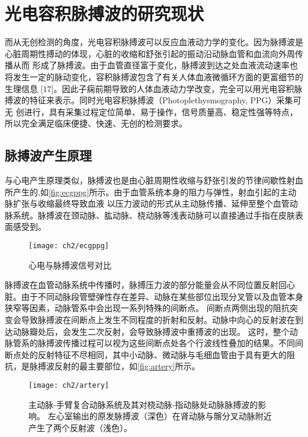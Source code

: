 \section{光电容积脉搏波的研究现状}
而从无创检测的角度，光电容积脉搏波可以反应血液动力学的变化。因为脉搏波是心脏周期性搏动的体现，心脏的收缩和舒张引起的振动沿动脉血管和血流向外周传播从而
形成了脉搏波。由于血管直径富于变化，脉搏波到达之处血液流动速率也将发生一定的脉动变化，容积脉搏波包含了有关人体血液微循环方面的更富细节的生理信息
[17]。因此子痫前期导致的人体血液动力学改变，完全可以用光电容积脉搏波的特征来表示。同时光电容积脉搏波（Photoplethysmography, PPG）采集可无
创进行，具有采集过程定位简单、易于操作，信号质量高、稳定性强等特点，所以完全满足临床便捷、快速、无创的检测要求。

\subsection{脉搏波产生原理}
与心电产生原理类似，脉搏波也是由心脏周期性收缩与舒张引发的节律间歇性射血所产生的\cite{Allen2007},如\autoref{fig:ecgppg}所示。由于血管系统本身的阻力与弹性，射血引起的主动脉扩张与收缩最终导致血液
以压力波动的形式从主动脉传播、延伸至整个血管动脉系统。脉搏波在颈动脉、肱动脉、桡动脉等浅表动脉可以直接通过手指在皮肤表面感受到\cite{PPGYY}。
\begin{figure}[htbp]
    \centering
    \texttt{[image: ch2/ecgppg]}
    \caption{\label{fig:ecgppg}心电与脉搏波信号对比}
\end{figure}

脉搏波在血管动脉系统中传播时，脉搏压力波的部分能量会从不同位置反射回心脏。由于不同动脉段管壁弹性存在差异、动脉在某些部位出现分叉管以及血管本身狭窄等因素，动脉管系中会出现一系列特殊的间断点。
间断点两侧出现的阻抗突变会导致脉搏波在间断点上发生不同程度的折射和反射。动脉中向心的反射波在到达动脉瓣处后，会发生二次反射，会导致脉搏波中重搏波的出现。
这时，整个动脉管系的脉搏波传播过程可以视为这些间断点处各个行波线性叠加的结果\cite{THOCBPM}。不同间断点处的反射特征不尽相同，其中小动脉、微动脉与毛细血管由于具有更大的阻抗，是脉搏波反射的最主要部位，如\autoref{fig:artery}所示。
\begin{figure}[htbp]
    \centering
    \texttt{[image: ch2/artery]}
    \caption[主动脉-手臂复合动脉系统及其对桡动脉-指动脉处动脉脉搏波的影响示意图]{\label{fig:artery}主动脉-手臂复合动脉系统及其对桡动脉-指动脉处动脉脉搏波的影响\cite{THOCBPM}。
    左心室输出的原发脉搏波（深色）在肾动脉与髂分叉动脉附近产生了两个反射波（浅色）。}
\end{figure}

